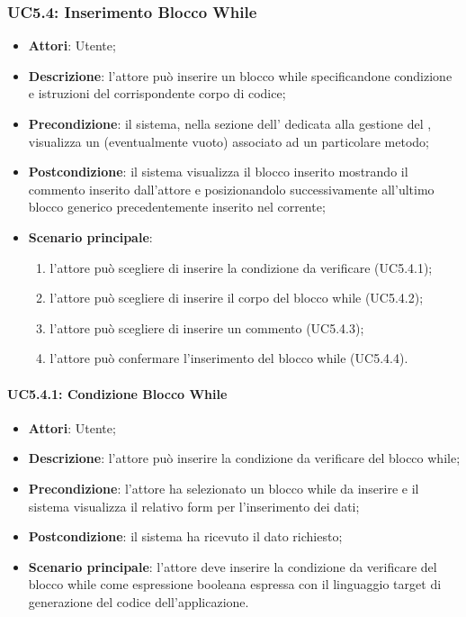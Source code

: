 \subsubsection{UC5.4: Inserimento Blocco While}
\label{UC5.4}
\begin{itemize}
	\item \textbf{Attori}: Utente;
	\item \textbf{Descrizione}: l'attore può inserire un blocco while specificandone condizione e istruzioni del corrispondente corpo di codice;
	\item \textbf{Precondizione}: il sistema, nella sezione dell' dedicata alla gestione del , visualizza un  (eventualmente vuoto) associato ad un particolare metodo;
	\item \textbf{Postcondizione}: il sistema visualizza il blocco inserito mostrando il commento inserito dall'attore e posizionandolo successivamente all'ultimo blocco generico precedentemente inserito nel  corrente;
	\item \textbf{Scenario principale}:
	\begin{enumerate}
		\item l'attore può scegliere di inserire la condizione da verificare (UC5.4.1);
		\item l'attore può scegliere di inserire il corpo del blocco while (UC5.4.2);
		\item l'attore può scegliere di inserire un commento (UC5.4.3);
		\item l'attore può confermare l'inserimento del blocco while (UC5.4.4).
	\end{enumerate}
\end{itemize}

\paragraph{UC5.4.1: Condizione Blocco While}
\label{UC5.4.1}
\begin{itemize}
	\item \textbf{Attori}: Utente;
	\item \textbf{Descrizione}: l'attore può inserire la condizione da verificare del blocco while;
	\item \textbf{Precondizione}: l'attore ha selezionato un blocco while da inserire e il sistema visualizza il relativo form per l'inserimento dei dati;
	\item \textbf{Postcondizione}: il sistema ha ricevuto il dato richiesto;
	\item \textbf{Scenario principale}: l'attore deve inserire la condizione da verificare del blocco while come espressione booleana espressa con il linguaggio target di generazione del codice dell'applicazione.
\end{itemize}

